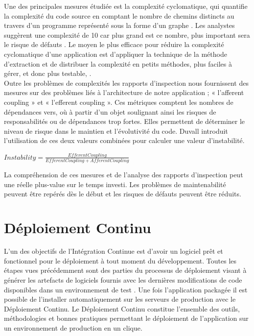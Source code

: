 \documentclass{report}
\begin{document}
        Une des principales mesures étudiée est la complexité cyclomatique, qui quantifie la complexité du code source en comptant le nombre de chemins distincts au travers d'un programme représenté sous la forme d'un graphe \cite{Kan03}. Les analystes suggèrent une complexité de 10 car plus grand est ce nombre, plus important sera le risque de défauts \cite{Wat96}. Le moyen le plus efficace pour réduire la complexité cyclomatique d’une application est d'appliquer la technique de la méthode d'extraction et de distribuer la complexité en petits méthodes, plus faciles à gérer, et donc plus testable, \cite{Duv07}.\\

        Outre les problèmes de complexités les rapports d’inspection nous fournissent des mesures sur des problèmes liés à l’architecture de notre application ; « l’afferent coupling » et « l’efferent coupling ». Ces métriques comptent les nombres de dépendances vers, où à partir d’un objet soulignant ainsi les risques de responsabilités ou de dépendances trop fortes. Elles permettent de déterminer le niveau de risque dans le maintien et l’évolutivité du code. Duvall introduit l'utilisation de ces deux valeurs combinées pour calculer une valeur d'instabilité.\\

        \begin{center}
            $Instability=\frac{EfferentCoupling}{EfferentCoupling + AfferentCoupling}$\\
        \end{center}

        La compréhension de ces mesures et de l'analyse des rapports d'inspection peut une réelle plus-value sur le temps investi. Les problèmes de maintenabilité peuvent être repérés dès le début et les risques de défauts peuvent être réduits.


    \section{Déploiement Continu}
    L'un des objectifs de l’Intégration Continue est d'avoir un logiciel prêt et fonctionnel pour le déploiement à tout moment du développement. Toutes les étapes vues précédemment sont des parties du processus de déploiement visant à générer les artefacts de logiciels fournis avec les dernières modifications de code disponibles dans un environnement de test \cite{Duv07}. Une fois l’application packagée il est possible de l'installer automatiquement sur les serveurs de production avec le Déploiement Continu. Le Déploiement Continu constitue l'ensemble des outils, méthodologies et bonnes pratiques permettant le déploiement de l'application sur un environnement de production en un clique.
\end{document}
